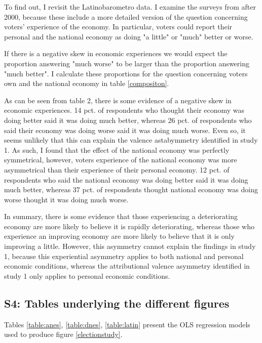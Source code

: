 \documentclass[a4paper,11pt]{article}
\begin{document}
	To find out, I revisit the Latinobarometro data. I examine the surveys from after 2000, because these include a more detailed version of the question concerning voters' experience of the economy. In particular, voters could report their personal and the national economy as doing "a little" or "much" better or worse. 
	
	If there is a negative skew in economic experiences we would expect the proportion answering "much worse" to be larger than the proportion answering "much better". I calculate these proportions for the question concerning voters own and the national economy in table \ref{compositon}.
	
	 
	
	As can be seen from table 2, there is some evidence of a negative skew in economic experiences.  14 pct. of respondents who thought their economy was doing better said it was doing much better, whereas 26 pct. of respondents who said their economy was doing worse said it was doing much worse. Even so, it seems unlikely that this can explain the valence astabymmetry identified in study 1. As such, I found that the effect of the national economy was perfectly symmetrical, however, voters experience of the national economy was more asymmetrical than their experience of their personal economy. 12 pct. of respondents who said the national economy was doing better said it was doing much better, whereas 37 pct. of respondents thought national economy was doing worse thought it was doing much worse.
	
	In summary, there is some evidence that those experiencing a deteriorating economy are more likely to believe it is rapidly deteriorating, whereas those who experience an improving economy are more likely to believe that it is only improving a little. However, this asymmetry  cannot explain the findings in study 1, because this experiential asymmetry applies to both national and personal economic conditions, whereas the attributional valence asymmetry identified in study 1 only applies to personal economic conditions.
	
	\newpage
	
	\subsection{S4: Tables underlying the different figures}
	Tables \ref{table:anes}, \ref{table:dnes}, \ref{table:latin} present the OLS regression models used to produce figure \ref{electionstudy}.
	
\end{document}
